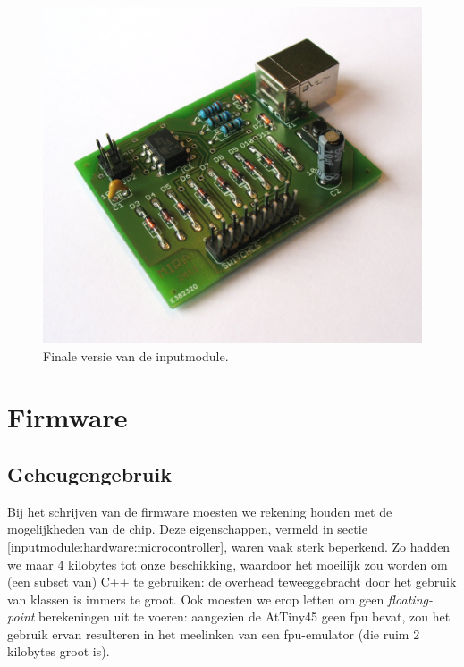 \begin{figure}
	\includegraphics[width=\textwidth]{afbeeldingen/inputmodule_afgewerkt}
	\caption{Finale versie van de inputmodule.}
	\label{fig:inputmodule}
\end{figure}


\chapter{Firmware}

\section{Geheugengebruik}

Bij het schrijven van de firmware moesten we rekening houden met de mogelijkheden van de chip. Deze eigenschappen, vermeld in sectie \ref{inputmodule:hardware:microcontroller}, waren vaak sterk beperkend. Zo hadden we maar 4 kilobytes tot onze beschikking, waardoor het moeilijk zou worden om (een subset van) C++ te gebruiken: de overhead teweeggebracht door het gebruik van klassen is immers te groot. Ook moesten we erop letten om geen \emph{floating-point} berekeningen uit te voeren: aangezien de AtTiny45 geen \ac{fpu} bevat, zou het gebruik ervan resulteren in het meelinken van een \ac{fpu}-emulator (die ruim 2 kilobytes groot is).

